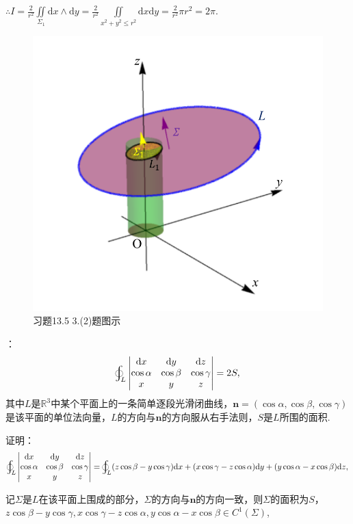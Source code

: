 \documentclass[12pt,UTF8,fleqn]{ctexart}
\newcommand{\varIInt}[4]{\iint\limits_{#1}#2\mathrm d#3\mathrm d#4}
\newcommand{\BLOInt}[2]{\varoint\nolimits_{#1}#2}
\newcommand{\md}[1]{\mathrm d#1}
\newcommand{\BSIInt}[2]{\iint\limits_{#1}#2}
\begin{document}
\begin{enumerate}
$\therefore I=\frac 2{r^2}\BSIInt{\Sigma_1}{\md x\wedge\md y}=\frac2{r^2}\varIInt{x^2+y^2\leqslant r^2}{}xy=\frac2{r^2}\pi r^2=2\pi$.
\begin{figure}[H]
\begin{center}
\includegraphics[height=0.7\textheight]{Figures24/Fig13-5-3-2.pdf}
\end{center}
\caption{习题13.5 3.(2)题图示}
\label{13-5-3-2}
\end{figure}
：
\[
\BLOInt L{\begin{vmatrix}
\md x&\md y&\md z\\
\cos\alpha&\cos\beta&\cos\gamma\\
x&y&z
\end{vmatrix}}=2S,
\]
其中$L$是$\mathbb R^3$中某个平面上的一条简单逐段光滑闭曲线，$\bm n=(\cos\alpha,\cos\beta,\cos\gamma)$是该平面的单位法向量，$L$的方向与$\bm n$的方向服从右手法则，$S$是$L$所围的面积.

证明：\[
\BLOInt L{\begin{vmatrix}
\md x&\md y&\md z\\
\cos\alpha&\cos\beta&\cos\gamma\\
x&y&z
\end{vmatrix}}=\BLOInt L{(z\cos\beta-y\cos\gamma)\md x+(x\cos\gamma-z\cos\alpha)\md y+(y\cos\alpha-x\cos\beta)\md z},
\]


记$\Sigma$是$L$在该平面上围成的部分，$\Sigma$的方向与$\bm n$的方向一致，则$\Sigma$的面积为$S$，$z\cos\beta-y\cos\gamma,x\cos\gamma-z\cos\alpha,y\cos\alpha-x\cos\beta\in C^1(\Sigma)$,


\end{enumerate}
\end{document}
